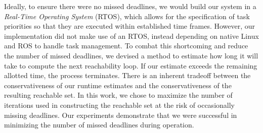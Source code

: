 \documentclass[manuscript,screen,review]{acmart}
\newcommand{\todo}[1]{\textcolor{red}{\textbf{\underline{TODO:}} #1}}
\begin{document}
Ideally, to ensure there were no missed deadlines, we would build our system in a \emph{Real-Time Operating System} (RTOS), which allows for the specification of task priorities so that they are executed within established time frames. However, our implementation did not make use of an RTOS, instead depending on native Linux and ROS to handle task management. To combat this shortcoming and reduce the number of missed deadlines, we devised a method to estimate how long it will take to compute the next reachability loop.  If our estimate exceeds the remaining allotted time, the process terminates. There is an inherent tradeoff between the conservativeness of our runtime estimates and the conservativeness of the resulting reachable set. In this work, we chose to maximize the number of iterations used in constructing the reachable set at the risk of occasionally missing deadlines. Our experiments demonstrate that we were successful in minimizing the number of missed deadlines during operation. %







\end{document}
